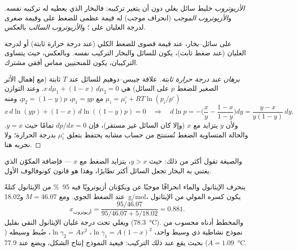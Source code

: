 \begin{definition}[الأزيوتروب]\label{def:b2:liquid-vapour-diagrams:azeotrope}
\emph{الأزيوتروب} خليط سائل يغلي دون أن
يتغير تركيبه: فالبخار الذي يعطيه له تركيبه نفسه. و\emph{الأزيوتروب
الموجب} (انحراف موجب) له
قيمة عظمى للضغط على  وقيمة صغرى لدرجة الغليان
على ؛ و\emph{الأزيوتروب السالب}
بالعكس.
\end{definition}

\begin{theorem}\label{thm:b2:liquid-vapour-diagrams:konovalov}
على  سائل--بخار، عند قيمة قصوى للضغط الكلي (عند
درجة حرارة ثابتة) أو لدرجة الغليان (عند ضغط ثابت)، يكون للسائل
والبخار التركيب نفسه. وبالعكس، حيث يتساوى
التركيبان، يكون للمنحنيين مماس أفقي مشترك.
\end{theorem}

\begin{proof}[برهان عند درجة حرارة ثابتة]
علاقة جيبس--دوهيم للسائل عند $T$ ثابتة (مع إهمال الأثر الصغير للضغط $p$
على السائل) هي $x\,d\mu_1 + (1 - x)\,d\mu_2 = 0$. وعند التوازن
$\mu_i = \mu_i^\circ + RT\ln(p_i/p^\circ)$ مع $p_1 = yp$، $p_2 = (1 - y)p$، ومنه
\[
  x\,d\ln(yp) + (1 - x)\,d\ln((1 - y)p) = 0
  \quad\Longrightarrow\quad
  d\ln p = -\Big(\frac{x}{y} - \frac{1 - x}{1 - y}\Big)dy
  = \frac{y - x}{y(1 - y)}\,dy .
\]
ولأن $y$ يتزايد مع $x$ (وإلا كان السائل غير مستقر)،
فإن $dp/dx = 0$ تمامًا حيث $y = x$. والحالة المتساوية الضغط تُستنتج من حساب
مشابه يحتفظ بتعلق $\mu_i^\circ$ بدرجة الحرارة؛ ولا
نجريه هنا.
\end{proof}

والصيغة تقول أكثر من ذلك: حيث $y > x$، يتزايد الضغط مع $x$ ---
فإضافة المكوّن الذي يغتني به البخار تجعل السائل أكثر
تطايرًا، وهذا هو قانون كونوفالوف الأول.

\begin{example}\label{ex:b2:liquid-vapour-diagrams:ethanol-water}
ينحرف الإيثانول والماء انحرافًا موجبًا عن  ويكوّنان أزيوتروبًا
فيه 95~\% من الإيثانول كتلةً عند الضغط الجوي. ومع $M = 46.07$ 
و\qty{18.02}{g/mol}، يكون كسره المولي من الإيثانول
\[
  x_{\text{أزيوتروب}} = \frac{95/46.07}{95/46.07 + 5/18.02} = 0.881 .
\]
ويغلي تحت درجة غليان الإيثانول النقي بقليل (\qty{78.3}{\degreeCelsius}). والمخطط
أدناه محسوب من نموذج نشاطية ذي وسيط واحد، $\ln\gamma_1 = A(1 -
x)^2$، $\ln\gamma_2 = Ax^2$، ضُبط وسيطه ($A = 1.09$) بحيث يقع
 عند ذلك التركيب: فيعيد النموذج إنتاج الشكل، ويضع
 عند \qty{77.9}{\degreeCelsius}.
\end{example}

